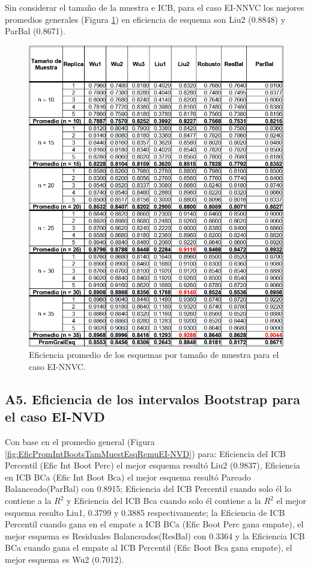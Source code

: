 Sin considerar el tamaño de la muestra e ICB, para el caso EI-NNVC los mejores promedios generales (Figura \ref{fig:EficPromEsqTamMuesEsqRemuEI-NNVC})  en eficiencia de esquema son Liu2 (0.8848) y ParBal (0.8671).

\begin{figure}[ht] 
	\centering 
	\includegraphics[width=0.70\linewidth]{img/EI_NNVC_Efic_Esq.png} 
	\caption{Eficiencia promedio de los esquemas por tamaño de muestra para el caso EI-NNVC.} 
	\label{fig:EficPromEsqTamMuesEsqRemuEI-NNVC}
\end{figure}
\FloatBarrier


\subsection*{A5. Eficiencia de los intervalos Bootstrap para el caso EI-NVD}

Con base en el promedio general  (Figura \ref{fig:EficPromIntBootsTamMuestEsqRemuEI-NVD}) para: Eficiencia del ICB Percentil (Efic Int Boot Perc) el mejor esquema resultó Liu2 (0.9837), Eficiencia en ICB BCa (Efic Int Boot Bca) el mejor esquema resultó Pareado Balanceado(ParBal) con 0.8915; Eficiencia del ICB Percentil cuando solo él lo contiene a la $R^{2}$ y Eficiencia del ICB Bca cuando solo él contiene a la $R^{2}$ el mejor esquema resulto Liu1, 0.3799 y 0.3885 respectivamente; la Eficiencia de ICB Percentil cuando gana en el empate a ICB BCa (Efic Boot Perc gana empate), el mejor esquema es Residuales Balanceados(ResBal) con 0.3364 y la Eficiencia ICB BCa cuando gana el empate al ICB Percentil (Efic Boot Bca gana empate), el mejor esquema es Wu2 (0.7012).\\


